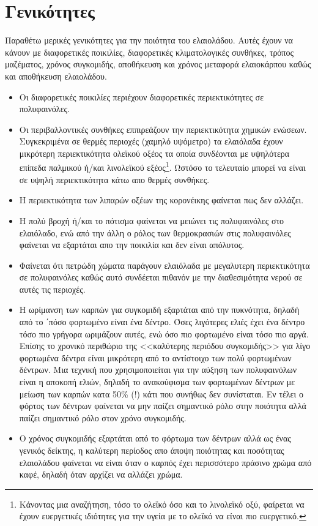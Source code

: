 \documentclass[12pt,a4paper]{article}
\begin{document}
\section*{Γενικότητες}
Παραθέτω μερικές γενικότητες για την ποιότητα του ελαιολάδου. Αυτές έχουν να κάνουν με διαφορετικές ποικιλίες, διαφορετικές κλιματολογικές συνθήκες, τρόπος μαζέματος, χρόνος συγκομιδής, αποθήκευση και χρόνος μεταφορά ελαιοκάρπου καθώς και αποθήκευση ελαιολάδου.
\begin{itemize}
	\item Οι διαφορετικές ποικιλίες περιέχουν διαφορετικές περιεκτικότητες σε πολυφαινόλες.   
	\item Οι περιβαλλοντικές συνθήκες εππιρεάζουν την περιεκτικότητα χημικών ενώσεων. Συγκεκριμένα σε θερμές περιοχές (χαμηλό υψόμετρο) τα ελαιόλαδα έχουν μικρότερη περιεκτικότητα ολεϊκού οξέος τα οποία συνδέονται με υψηλότερα επίπεδα παλμικού ή/και λινολεϊκού εξέος\footnote{Κάνοντας μια αναζήτηση, τόσο το ολεϊκό όσο και το λινολεϊκό οξύ, φαίρεται να έχουν ευεργετικές ιδιότητες για την υγεία με το ολεϊκό να είναι πιο ευεργετικό.}. Ωστόσο το τελευταίο μπορεί να είναι σε υψηλή περιεκτικότητα κάτω απο θερμές συνθήκες.   
	\item Η περιεκτικότητα των λιπαρών οξέων της κορονέικης φαίνεται πως δεν αλλάζει. 
	\item Η πολύ βροχή ή/και το πότισμα φαίνεται να μειώνει τις πολυφαινόλες στο ελαιόλαδο, ενώ από την άλλη ο ρόλος των θερμοκρασιών στις πολυφαινόλες φαίνεται να εξαρτάται απο την ποικιλία και δεν είναι απόλυτος.
	\item Φαίνεται ότι πετρώδη χώματα παράγουν ελαιόλαδα με μεγαλυτερη περιεκτικότητα σε πολυφαινόλες καθώς αυτό συνδέεται πιθανόν με την διαθεσιμότητα νερού σε αυτές τις περιοχές. 
	\item Η ωρίμανση των καρπών για συγκομιδή εξαρτάται από την πυκνότητα, δηλαδή από το ΄πόσο φορτωμένο είναι ένα δέντρο. Όσες λιγότερες ελιές έχει ένα δέντρο τόσο πιο γρήγορα ωριμάζουν αυτές, ενώ όσο πιο φορτωμένο είναι τόσο πιο αργά.  Επίσης το χρονικό περιθώριο της <<καλύτερης περιόδου συγκομιδής>> για λίγο φορτωμένα δέντρα είναι μικρότερη από το αντίστοιχο των πολύ φορτωμένων δέντρων. Μια τεχνική που χρησιμοποιείται για την αύξηση των πολυφαινόλων είναι η αποκοπή ελιών, δηλαδή το ανακούφισμα των φορτωμένων δέντρων με μείωση των καρπών κατα 50\% (!) κάτι που συνήθως δεν συνίσταται. Εν τέλει ο φόρτος των δέντρων φαίνεται να μην παίζει σημαντικό ρόλο στην ποιότητα αλλά παίζει σημαντικό ρόλο στον χρόνο συγκομιδής.
	\item Ο χρόνος συγκομιδής εξαρτάται από το φόρτωμα των δέντρων αλλά ως ένας γενικός δείκτης, η καλύτερη περίοδος απο άποψη ποιότητας και ποσότητας ελαιολάδου φαίνεται να είναι όταν ο καρπός έχει περισσότερο πράσινο χρώμα από καφέ, δηλαδή όταν αρχίζει να αλλάζει χρώμα.

\end{itemize}
\end{document}
